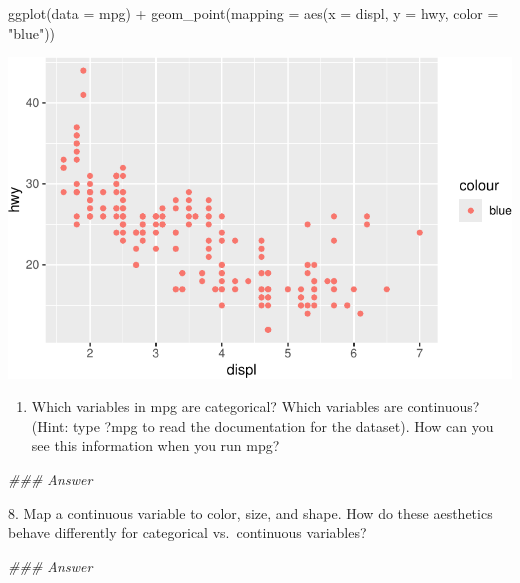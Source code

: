 \documentclass[
  letterpaper,
  DIV=11,
  numbers=noendperiod]{scrreprt}
\newenvironment{Shaded}{\begin{snugshade}}{\end{snugshade}}
\newcommand{\AttributeTok}[1]{\textcolor[rgb]{0.40,0.45,0.13}{#1}}
\newcommand{\DocumentationTok}[1]{\textcolor[rgb]{0.37,0.37,0.37}{\textit{#1}}}
\newcommand{\FunctionTok}[1]{\textcolor[rgb]{0.28,0.35,0.67}{#1}}
\newcommand{\NormalTok}[1]{\textcolor[rgb]{0.00,0.23,0.31}{#1}}
\newcommand{\SpecialCharTok}[1]{\textcolor[rgb]{0.37,0.37,0.37}{#1}}
\newcommand{\StringTok}[1]{\textcolor[rgb]{0.13,0.47,0.30}{#1}}
\providecommand{\tightlist}{%
  \setlength{\itemsep}{0pt}\setlength{\parskip}{0pt}}\usepackage{longtable,booktabs,array}
\begin{document}
\begin{Shaded}
\begin{Highlighting}[]
\FunctionTok{ggplot}\NormalTok{(}\AttributeTok{data =}\NormalTok{ mpg) }\SpecialCharTok{+} 
  \FunctionTok{geom\_point}\NormalTok{(}\AttributeTok{mapping =} \FunctionTok{aes}\NormalTok{(}\AttributeTok{x =}\NormalTok{ displ, }\AttributeTok{y =}\NormalTok{ hwy, }\AttributeTok{color =} \StringTok{"blue"}\NormalTok{))}
\end{Highlighting}
\end{Shaded}

\includegraphics{Beginning_Data_Visualization_files/figure-pdf/Ex6-1.pdf}

\begin{enumerate}
\def\labelenumi{\arabic{enumi}.}
\setcounter{enumi}{6}
\tightlist
\item
  Which variables in mpg are categorical? Which variables are
  continuous? (Hint: type ?mpg to read the documentation for the
  dataset). How can you see this information when you run mpg?
\end{enumerate}

\begin{Shaded}
\begin{Highlighting}[]
\DocumentationTok{\#\#\# Answer}
\end{Highlighting}
\end{Shaded}

8. Map a continuous variable to color, size, and shape. How do these
aesthetics behave differently for categorical vs.~continuous variables?

\begin{Shaded}
\begin{Highlighting}[]
\DocumentationTok{\#\#\# Answer}
\end{Highlighting}
\end{Shaded}
\end{document}
